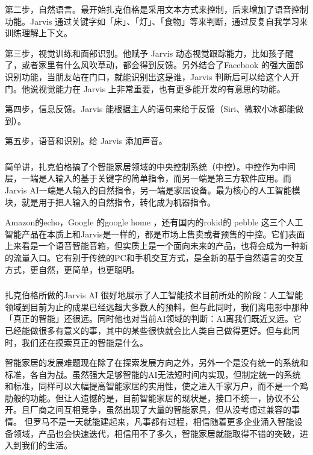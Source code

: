\documentclass{ctexart} %
\begin{document}
第二步，自然语言。最开始扎克伯格是采用文本方式来控制，后来增加了语音控制功能。Jarvis 通过关键字如「床」、「灯」、「食物」等来判断，通过反复自我学习来训练理解上下文。

第三步，视觉训练和面部识别。他赋予 Jarvis 动态视觉跟踪能力，比如孩子醒了，或者家里有什么风吹草动，都会得到反馈。另外结合了Facebook 的强大面部识别功能，当朋友站在门口，就能识别出这是谁，Jarvis 判断后可以给这个人开门。他说视觉能力在 Jarvis 上非常重要，也有更多能开发的有意思的功能。

第四步，信息反馈。Jarvis 能根据主人的语句来给于反馈（Siri、微软小冰都能做到）。

第五步，语音和识别。给 Jarvis 添加声音。
\subsubsection*{}
\paragraph{}
 简单讲，扎克伯格搞了个智能家居领域的中央控制系统（中控）。中控作为中间层，一端是人输入的基于关键字的简单指令，而另一端是第三方软件应用。而Jarvis AI一端是人输入的自然指令，另一端是家居设备。最为核心的人工智能模块，就是用于把人输入的自然指令，转化成为机器指令。
 
 Amazon的echo，Google 的google home ，还有国内的rokid的 pebble 这三个人工智能产品在本质上和Jarvis是一样的，都是市场上售卖或者预售的中控。它们表面上来看是一个语音智能音箱，但实质上是一个面向未来的产品，也将会成为一种新的流量入口。它有别于传统的PC和手机交互方式，是全新的基于自然语言的交互方式，更自然，更简单，也更聪明。

\subsubsection*{}
\paragraph{}
扎克伯格所做的Jarvis AI 很好地展示了人工智能技术目前所处的阶段：人工智能领域到目前为止的成果已经远超大多数人的预料，但与此同时，我们离电影中那种「真正的智能」还很远。同时他也对当前AI领域的判断：AI离我们既近又远。它已经能做很多有意义的事，其中的某些很快就会比人类自己做得更好。但与此同时，我们还在摸索真正的智能是什么。

智能家居的发展难题现在除了在探索发展方向之外，另外一个是没有统一的系统和标准，各自为战。虽然强大足够智能的AI无法短时间内实现，但制定统一的系统和标准，同样可以大幅提高智能家居的实用性，使之进入千家万户，而不是一个鸡肋般的功能。但让人遗憾的是，目前智能家居的现状是，接口不统一，协议不公开。且厂商之间互相竞争，虽然出现了大量的智能家具，但从没考虑过兼容的事情。
但罗马不是一天就能建起来，凡事都有过程，相信随着更多企业涌入智能设备领域，产品也会快速迭代，相信用不了多久，智能家居就能取得不错的突破，进入到我们的生活。
\end{document}
